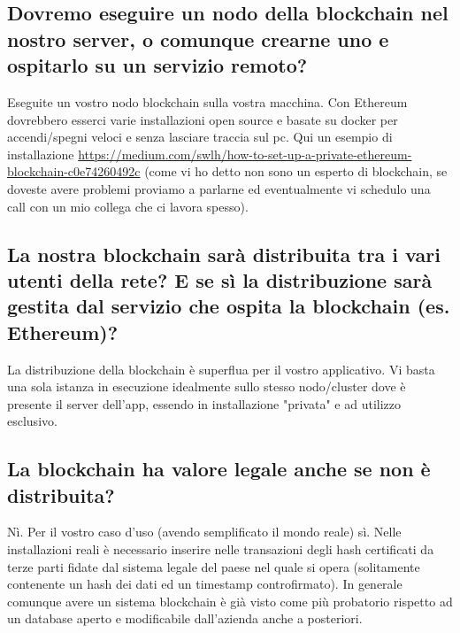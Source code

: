 \subsection*{Dovremo eseguire un nodo della blockchain nel nostro server, o comunque crearne uno e ospitarlo su un servizio remoto?}
Eseguite un vostro nodo blockchain sulla vostra macchina. Con Ethereum dovrebbero esserci varie installazioni open source e basate su docker per accendi/spegni veloci e senza lasciare traccia sul pc. Qui un esempio di installazione \href{https://medium.com/swlh/how-to-set-up-a-private-ethereum-blockchain-c0e74260492c}{https://medium.com/swlh/how-to-set-up-a-private-ethereum-blockchain-c0e74260492c} (come vi ho detto non sono un esperto di blockchain, se doveste avere problemi proviamo a parlarne ed eventualmente vi schedulo una call con un mio collega che ci lavora spesso).
\subsection*{La nostra blockchain sarà distribuita tra i vari utenti della rete? E se sì la distribuzione sarà gestita dal servizio che ospita la blockchain (es. Ethereum)?  }
La distribuzione della blockchain è superflua per il vostro applicativo. Vi basta una sola istanza in esecuzione idealmente sullo stesso nodo/cluster dove è presente il server dell'app, essendo in installazione "privata" e ad utilizzo esclusivo.
\subsection*{La blockchain ha valore legale anche se non è distribuita?}
Nì. Per il vostro caso d'uso (avendo semplificato il mondo reale) sì. Nelle installazioni reali è necessario inserire nelle transazioni degli hash certificati da terze parti fidate dal sistema legale del paese nel quale si opera (solitamente contenente un hash dei dati ed un timestamp controfirmato). In generale comunque avere un sistema blockchain è già visto come più probatorio rispetto ad un database aperto e modificabile dall'azienda anche a posteriori.

